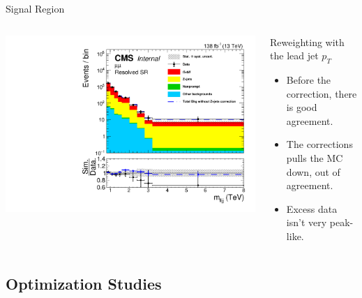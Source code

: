 \documentclass[aspectratio=169]{beamer}
\begin{document}
\begin{frame}{Signal Region}
  \begin{columns}
    \begin{column}{0.50\textwidth}
      \centering
      \includegraphics[width=\textwidth]{../figures/plots/mlljj-sr-mumu.pdf}
    \end{column}
    \begin{column}{0.50\textwidth}
        \centering
        \resizebox{0.55\columnwidth}{!}{%
        
        }

      \vfill
      
      \begin{block}{Reweighting with the lead jet $p_T$}
        \begin{itemize}
          \item Before the correction, there is good agreement.
          \item The corrections pulls the MC down, out of agreement.
          \item Excess data isn't very peak-like.
        \end{itemize}
      \end{block}
    \end{column}
  \end{columns}
\end{frame}

\subsection{Optimization Studies}
\end{document}
